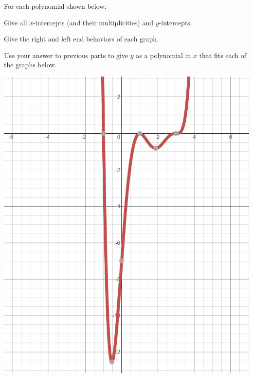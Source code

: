 \bq For each polynomial shown below:
\be
\item Give all $x$-intercepts (and their multiplicities) and $y$-intercepts.
\item Give the right and left end behaviors of each graph.
\item Use your answer to previous parts to give $y$ as a polynomial in $x$ that fits each of the graphs below.
\ee
\begin{center} \includegraphics[scale=.4]{p1.png} \end{center}

